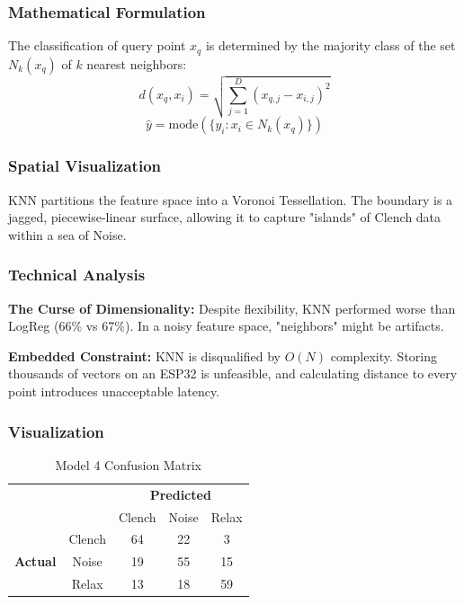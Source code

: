 \documentclass{article}
\begin{document}
\subsubsection{Mathematical Formulation}
The classification of query point $x_q$ is determined by the majority class of the set $N_k(x_q)$ of $k$ nearest neighbors:
\begin{equation}
    d(x_q, x_i) = \sqrt{\sum_{j=1}^{D} (x_{q,j} - x_{i,j})^2}
\end{equation}
\begin{equation}
    \hat{y} = \text{mode}(\{y_i : x_i \in N_k(x_q)\})
\end{equation}

\subsubsection{Spatial Visualization}
KNN partitions the feature space into a Voronoi Tessellation. The boundary is a jagged, piecewise-linear surface, allowing it to capture "islands" of Clench data within a sea of Noise.

\subsubsection{Technical Analysis}
\textbf{The Curse of Dimensionality:} Despite flexibility, KNN performed worse than LogReg (66\% vs 67\%). In a noisy feature space, "neighbors" might be artifacts.

\textbf{Embedded Constraint:} KNN is disqualified by $O(N)$ complexity. Storing thousands of vectors on an ESP32 is unfeasible, and calculating distance to every point introduces unacceptable latency.

\subsubsection{Visualization}
    \begin{table}[h]
        \centering
        \begin{tabular}{cc|ccc}
            & & \multicolumn{3}{c}{\textbf{Predicted}} \\
            & & Clench & Noise & Relax \\
            \hline
            \multirow{3}{*}{\textbf{Actual}} & Clench & 64 & 22 & 3 \\
            & Noise & 19 & 55 & 15 \\
            & Relax & 13 & 18 & 59 \\
        \end{tabular}
        \caption{Model 4 Confusion Matrix}
    \end{table}
\end{document}
